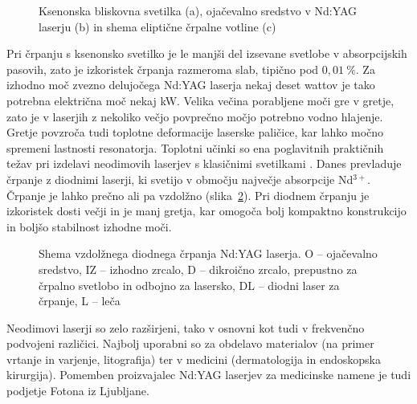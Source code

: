 \begin{figure}[h]
\centering
\def\svgwidth{120truemm} 

\caption{Ksenonska bliskovna svetilka (a), ojačevalno sredstvo v Nd:YAG laserju (b) 
in shema eliptične črpalne votline (c)}
\label{fig:Nd}
\end{figure}

Pri črpanju s ksenonsko svetilko je le manjši del izsevane svetlobe v
absorpcijskih pasovih, zato je izkoristek črpanja razmeroma slab, tipično 
pod $0,01~\%$. Za izhodno moč zvezno delujočega Nd:YAG laserja nekaj deset wattov je tako
potrebna električna moč nekaj kW. Velika večina porabljene moči 
gre v gretje, zato je v laserjih z nekoliko večjo povprečno
močjo potrebno vodno hlajenje. Gretje povzroča tudi toplotne deformacije
laserske paličice, kar lahko močno spremeni lastnosti resonatorja. Toplotni
učinki so ena poglavitnih praktičnih težav pri izdelavi neodimovih
laserjev s klasičnimi svetilkami . Danes prevladuje
 črpanje z diodnimi laserji, ki svetijo v območju največje
absorpcije Nd$^{3+}$. Črpanje je lahko prečno ali pa vzdolžno (slika~\ref{fig:NdS}). 
Pri diodnem črpanju je izkoristek dosti večji in je manj gretja, kar omogoča 
bolj kompaktno konstrukcijo in boljšo stabilnost izhodne moči.
\begin{figure}[h]
\centering
\def\svgwidth{120truemm} 

\caption{Shema vzdolžnega diodnega črpanja Nd:YAG laserja. O -- ojačevalno sredstvo, 
IZ -- izhodno zrcalo, D -- dikroično zrcalo, 
prepustno za črpalno svetlobo in odbojno za lasersko, DL -- diodni 
laser za črpanje, L -- leča
}
\label{fig:NdS}
\end{figure}

Neodimovi laserji so zelo razširjeni, tako v osnovni kot tudi v frekvenčno 
podvojeni različici. 
Najbolj uporabni so za obdelavo materialov (na primer vrtanje in varjenje, 
litografija) ter v medicini (dermatologija in endoskopska kirurgija). 
Pomemben proizvajalec Nd:YAG laserjev 
za medicinske namene je tudi podjetje Fotona iz Ljubljane. 

